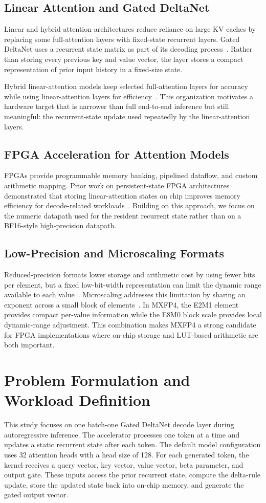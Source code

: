 \documentclass[conference]{IEEEtran}
\begin{document}
\subsection{Linear Attention and Gated DeltaNet}
Linear and hybrid attention architectures reduce reliance on large KV caches by replacing some full-attention layers with fixed-state recurrent layers. Gated DeltaNet uses a recurrent state matrix as part of its decoding process~\cite{b4}. Rather than storing every previous key and value vector, the layer stores a compact representation of prior input history in a fixed-size state.

Hybrid linear-attention models keep selected full-attention layers for accuracy while using linear-attention layers for efficiency~\cite{b5,b10,b11}. This organization motivates a hardware target that is narrower than full end-to-end inference but still meaningful: the recurrent-state update used repeatedly by the linear-attention layers.

\subsection{FPGA Acceleration for Attention Models}
FPGAs provide programmable memory banking, pipelined dataflow, and custom arithmetic mapping. Prior work on persistent-state FPGA architectures demonstrated that storing linear-attention states on chip improves memory efficiency for decode-related workloads~\cite{b6}. Building on this approach, we focus on the numeric datapath used for the resident recurrent state rather than on a BF16-style high-precision datapath.

\subsection{Low-Precision and Microscaling Formats}
Reduced-precision formats lower storage and arithmetic cost by using fewer bits per element, but a fixed low-bit-width representation can limit the dynamic range available to each value~\cite{b7}. Microscaling addresses this limitation by sharing an exponent across a small block of elements~\cite{b7}. In MXFP4, the E2M1 element provides compact per-value information while the E8M0 block scale provides local dynamic-range adjustment. This combination makes MXFP4 a strong candidate for FPGA implementations where on-chip storage and LUT-based arithmetic are both important.

\section{Problem Formulation and Workload Definition}
This study focuses on one batch-one Gated DeltaNet decode layer during autoregressive inference. The accelerator processes one token at a time and updates a static recurrent state after each token. The default model configuration uses 32 attention heads with a head size of 128. For each generated token, the kernel receives a query vector, key vector, value vector, beta parameter, and output gate. These inputs access the prior recurrent state, compute the delta-rule update, store the updated state back into on-chip memory, and generate the gated output vector.
\end{document}
